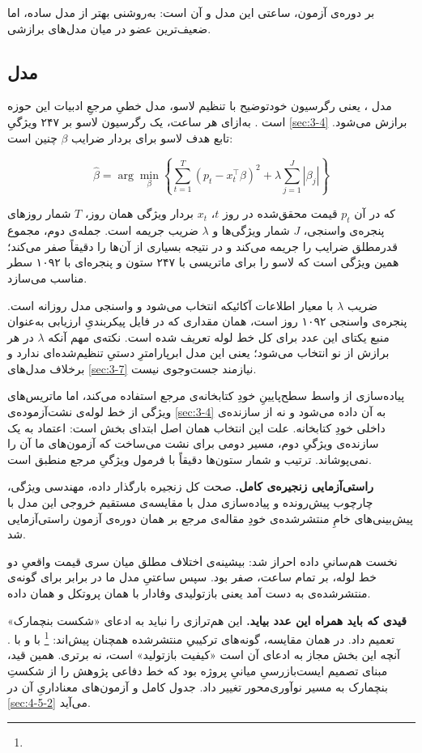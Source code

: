 بر دوره‌ی آزمون،  ساعتی این مدل  و  آن  است:
به‌روشنی بهتر از مدل ساده، اما ضعیف‌ترین عضو در میان مدل‌های برازشی.

\subsection*{مدل }

مدل ، یعنی رگرسیون خودتوضیح با تنظیم لاسو، مدل خطیِ مرجعِ ادبیات این حوزه
است \cite{lago_forecasting_2021, lago_forecasting_2018}. به‌ازای هر ساعت، یک رگرسیون
لاسو بر ۲۴۷ ویژگیِ \cref{sec:3-4} برازش می‌شود. تابع هدف لاسو برای بردار ضرایب $\beta$
چنین است:

\begin{equation}
\hat{\beta} = \arg\min_{\beta}
\left\{ \sum_{t=1}^{T}\left(p_t - x_t^{\top}\beta\right)^2
+ \lambda \sum_{j=1}^{J} \left|\beta_j\right| \right\}
\end{equation}

که در آن $p_t$ قیمت محقق‌شده در روز $t$، $x_t$ بردار ویژگی همان روز، $T$ شمار روزهای
پنجره‌ی واسنجی، $J$ شمار ویژگی‌ها و $\lambda$ ضریب جریمه است. جمله‌ی دوم، مجموع قدرمطلق
ضرایب را جریمه می‌کند و در نتیجه بسیاری از آن‌ها را دقیقاً صفر می‌کند؛ همین ویژگی
است که لاسو را برای ماتریسی با ۲۴۷ ستون و پنجره‌ای با ۱۰۹۲ سطر مناسب می‌سازد.

ضریب $\lambda$ با معیار اطلاعات آکائیکه انتخاب می‌شود و واسنجی مدل روزانه است.
پنجره‌ی واسنجی ۱۰۹۲ روز است، همان مقداری که در فایل پیکربندیِ ارزیابی به‌عنوان منبع
یکتای این عدد برای کل خط لوله تعریف شده است. نکته‌ی مهم آنکه $\lambda$ در هر برازش از
نو انتخاب می‌شود؛ یعنی این مدل ابرپارامترِ دستیِ تنظیم‌شده‌ای ندارد و برخلاف مدل‌های
\cref{sec:3-7} نیازمند جست‌وجوی  نیست.

پیاده‌سازی از واسط سطح‌پایینِ خودِ کتابخانه‌ی مرجع استفاده می‌کند، اما ماتریس‌های
ویژگی از خط لوله‌ی نشت‌آزموده‌ی \cref{sec:3-4} به آن داده می‌شود و نه از سازنده‌ی داخلی خودِ
کتابخانه. علت این انتخاب همان اصل ابتدای بخش است: اعتماد به یک سازنده‌ی ویژگیِ دوم،
مسیر دومی برای نشت می‌ساخت که آزمون‌های ما آن را نمی‌پوشاند. ترتیب و شمار ستون‌ها
دقیقاً با فرمول ویژگیِ مرجع منطبق است.

\textbf{راستی‌آزمایی زنجیره‌ی کامل.} صحت کل زنجیره  بارگذار داده، مهندسی ویژگی،
چارچوب پیش‌رونده و پیاده‌سازی مدل  با مقایسه‌ی مستقیم خروجی این مدل با
پیش‌بینی‌های خامِ منتشرشده‌ی خودِ مقاله‌ی مرجع بر همان دوره‌ی آزمون راستی‌آزمایی شد.

نخست هم‌سانیِ داده احراز شد: بیشینه‌ی اختلاف مطلق میان سری قیمت واقعیِ دو خط لوله، بر
تمام  ساعت، صفر بود. سپس  ساعتیِ مدل ما  در برابر
 برای گونه‌ی منتشرشده‌ی  به دست آمد  یعنی بازتولیدی وفادار
با همان پروتکل و همان داده.

\textbf{قیدی که باید همراه این عدد بیاید.} این هم‌ترازی را نباید به ادعای «شکست
بنچمارک» تعمیم داد. در همان مقایسه، گونه‌های ترکیبیِ منتشرشده همچنان پیش‌اند:
\footnote{} با  و
 با . آنچه این بخش
مجاز به ادعای آن است «کیفیت بازتولید» است، نه برتری. همین قید، مبنای تصمیم
ایست‌بازرسیِ میانیِ پروژه بود که خط دفاعی پژوهش را از شکستِ بنچمارک به مسیر
نوآوری‌محور تغییر داد. جدول کامل و آزمون‌های معناداریِ آن در \cref{sec:4-5-2} می‌آید.
